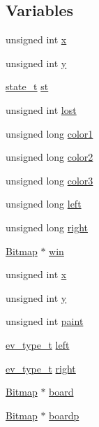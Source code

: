 \subsection*{Variables}
\begin{DoxyCompactItemize}
\item 
unsigned int \hyperlink{group___game_ga676e0da0ef83bbbdf42538e54b97506b}{x}
\item 
unsigned int \hyperlink{group___game_gac30de26db5f6d1c18c63913729adca7d}{y}
\item 
\hyperlink{group___game_gaa0aafed44fec19806d8f9ad834be1248}{state\+\_\+t} \hyperlink{group___game_ga9a379079ab305d43e4c73334578f9325}{st}
\item 
unsigned int \hyperlink{group___game_ga6325f05cd0c308b41c677ec0709707a4}{lost}
\item 
unsigned long \hyperlink{group___game_gab817949ca924898b4cc07f87e9936c37}{color1}
\item 
unsigned long \hyperlink{group___game_gad66b83194e360e19ab982ad5e92c0e47}{color2}
\item 
unsigned long \hyperlink{group___game_ga4a11e85efa70b04b658bbb13b38331a6}{color3}
\item 
unsigned long \hyperlink{group___game_ga74dc52caaf927df421fcbda624d6db30}{left}
\item 
unsigned long \hyperlink{group___game_gad9567130205b4716d5412d5d936cdeb0}{right}
\item 
\hyperlink{struct_bitmap}{Bitmap} $\ast$ \hyperlink{group___game_ga710a78637db874c6ee469e4a3f339f7f}{win}
\item 
unsigned int \hyperlink{group___game_ga676e0da0ef83bbbdf42538e54b97506b}{x}
\item 
unsigned int \hyperlink{group___game_gac30de26db5f6d1c18c63913729adca7d}{y}
\item 
unsigned int \hyperlink{group___game_ga948c4c379ef991ba0160f8067ee6f56b}{paint}
\item 
\hyperlink{group___game_gaabca14b349ba212174a00ffc1d2a2f31}{ev\+\_\+type\+\_\+t} \hyperlink{group___game_gaecafb2f51c578021f704c30241e9032c}{left}
\item 
\hyperlink{group___game_gaabca14b349ba212174a00ffc1d2a2f31}{ev\+\_\+type\+\_\+t} \hyperlink{group___game_ga83501d338e4a35412684e3a442955660}{right}
\item 
\hyperlink{struct_bitmap}{Bitmap} $\ast$ \hyperlink{group___game_ga2b89423d3599327880528e2d4ef4d95a}{board}
\item 
\hyperlink{struct_bitmap}{Bitmap} $\ast$ \hyperlink{group___game_ga39e613d7078d5537d3bbaaa3aed89f62}{boardp}

\end{DoxyCompactItemize}
